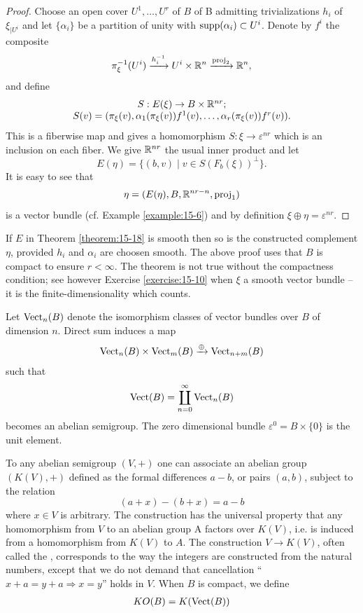 \begin{proof}
  Choose an open cover $U^1, \ldots, U^r$ of $B$ of B admitting trivializations $h_i$ of
  $\xi_{|U^i}$ and let $\{\alpha_i\}$ be a partition of unity with $\operatorname{supp}(\alpha_i)\subset U^i$.
  Denote by $f^i$ the composite
  \[
    \pi^{-1}_\xi(U^i)\xra[h^{-1}_i] U^i\times\RR^n\xra[\R{proj}_2] \RR^n,
  \]
  and define 
  \begin{align}\label{eq:15-2}
    \begin{matrix}
      S:E(\xi)\to B\times{\ensuremath{\mathbb{R}}}^{nr};\\
      S(v) = (\pi_\xi(v), \alpha_1(\pi_\xi(v))f^1(v), \ldots, \alpha_r(\pi_\xi(v))f^r(v)).
    \end{matrix}
  \end{align}
  This is a fiberwise map and gives a homomorphism $S:\xi\to\varepsilon^{nr}$ which is an
  inclusion on each fiber. We give ${\mathbb{R}}^{nr}$ the usual inner product and let
  \[
    E(\eta) = \{(b, v)\mid v\in S(F_b(\xi))^\perp\}.
  \]
  It is easy to see that 
  \[
    \eta = (E(\eta), B, {\mathbb{R}}^{nr-n}, \mathrm{proj}_1)
  \]
  is a vector bundle (cf. Example \ref{example:15-6}) and by definition $\xi\oplus\eta = \varepsilon^{nr}$.
\end{proof}

If $E$ in Theorem \ref{theorem:15-18} is smooth then so is the constructed complement $\eta$, provided
$h_i$ and $\alpha_i$ are choosen smooth. The above proof uses that $B$ is compact to ensure
$r < \infty$. The theorem is not true without the compactness condition; see however
Exercise \ref{exercise:15-10} when $\xi$ a smooth vector bundle -- it is the finite-dimensionality
which counts.

Let $\mathrm{Vect}_n(B)$ denote the isomorphism classes of vector bundles over $B$ of
dimension $n$. Direct sum induces a map
\[
  \R{Vect}_n(B)\times \R{Vect}_m(B)\xra[\oplus] \R{Vect}_{n+m}(B)
\]
such that 
\[
  \mathrm{Vect}(B) = \coprod_{n=0}^\infty \mathrm{Vect}_n(B)
\]
becomes an abelian semigroup. The zero dimensional bundle $\varepsilon^0=B\times\{0\}$ is the unit element.

To any abelian semigroup $(V, +)$ one can associate an abelian group $(K(V), +)$
defined as the formal differences $a - b$, or pairs $(a, b)$, subject to the relation
\[
  (a+x) - (b+x) = a-b
\]
where $x\in V$ is arbitrary. The construction has the universal property that
any homomorphism from $V$ to an abelian group A factors over $K(V)$, i.e. is
induced from a homomorphism from $K(V)$ to $A$. The construction $V\to K(V)$,
often called the , corresponds to the way the integers
are constructed from the natural numbers, except that we do not demand that
cancellation ``$x+a=y+a\Rightarrow x=y$'' holds in $V$. When $B$ is compact, we define
\begin{align}\label{eq:15-3}
  KO(B) = K(\mathrm{Vect}(B))
\end{align}

